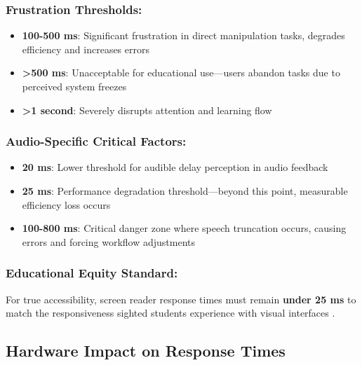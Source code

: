 \subsubsection{Frustration Thresholds:}

\begin{itemize}
	\item \textbf{100-500 ms}: Significant frustration in direct manipulation tasks, degrades efficiency and increases errors \supercite{Card1983ThePsychologyOfHumanComputerInteraction}
	\item \textbf{>500 ms}: Unacceptable for educational use—users abandon tasks due to perceived system freezes \supercite{Sears1993TheEffectOfResponseTime}
	\item \textbf{>1 second}: Severely disrupts attention and learning flow \supercite{Dix2004HumanComputerInteraction}
\end{itemize}


\subsubsection{Audio-Specific Critical Factors:}

\begin{itemize}
	\item \textbf{20 ms}: Lower threshold for audible delay perception in  audio feedback \supercite{Grunwald1999AuditoryLatency}
	\item \textbf{25 ms}: Performance degradation threshold—beyond this point, measurable efficiency loss occurs \supercite{Fowler2011ScreenReaderLatency}
	\item \textbf{100-800 ms}: Critical danger zone where speech truncation occurs, causing  errors and forcing workflow adjustments \supercite{Bigham2014UnderstandingScreenReaderUsage}
\end{itemize}


\subsubsection{Educational Equity Standard:}

For true accessibility, screen reader response times must remain \textbf{under 25 ms} to match the responsiveness sighted students experience with visual interfaces \supercite{W3C2018WCAG21}.

\subsection{Hardware Impact on Response Times}\label{hardware-impact-on-response-times}

